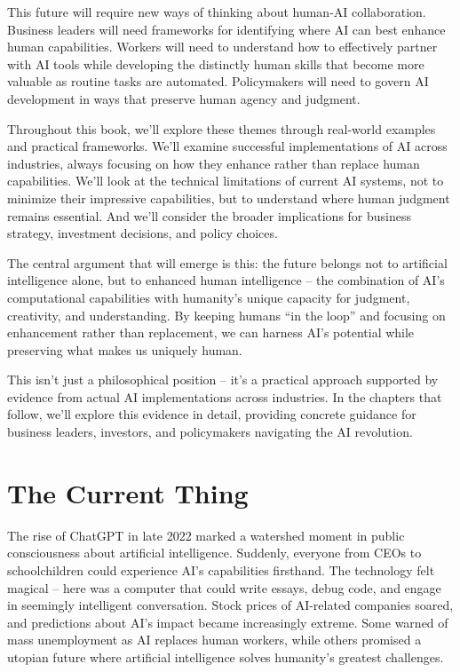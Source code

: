 \documentclass[
  Letterpaper,
]{scrbook}
\begin{document}
This future will require new ways of thinking about human-AI
collaboration. Business leaders will need frameworks for identifying
where AI can best enhance human capabilities. Workers will need to
understand how to effectively partner with AI tools while developing the
distinctly human skills that become more valuable as routine tasks are
automated. Policymakers will need to govern AI development in ways that
preserve human agency and judgment.

Throughout this book, we'll explore these themes through real-world
examples and practical frameworks. We'll examine successful
implementations of AI across industries, always focusing on how they
enhance rather than replace human capabilities. We'll look at the
technical limitations of current AI systems, not to minimize their
impressive capabilities, but to understand where human judgment remains
essential. And we'll consider the broader implications for business
strategy, investment decisions, and policy choices.

The central argument that will emerge is this: the future belongs not to
artificial intelligence alone, but to enhanced human intelligence -- the
combination of AI's computational capabilities with humanity's unique
capacity for judgment, creativity, and understanding. By keeping humans
``in the loop'' and focusing on enhancement rather than replacement, we
can harness AI's potential while preserving what makes us uniquely
human.

This isn't just a philosophical position -- it's a practical approach
supported by evidence from actual AI implementations across industries.
In the chapters that follow, we'll explore this evidence in detail,
providing concrete guidance for business leaders, investors, and
policymakers navigating the AI revolution.

\section{The Current Thing}\label{the-current-thing}

The rise of ChatGPT in late 2022 marked a watershed moment in public
consciousness about artificial intelligence. Suddenly, everyone from
CEOs to schoolchildren could experience AI's capabilities firsthand. The
technology felt magical -- here was a computer that could write essays,
debug code, and engage in seemingly intelligent conversation. Stock
prices of AI-related companies soared, and predictions about AI's impact
became increasingly extreme. Some warned of mass unemployment as AI
replaces human workers, while others promised a utopian future where
artificial intelligence solves humanity's greatest challenges.
\end{document}
